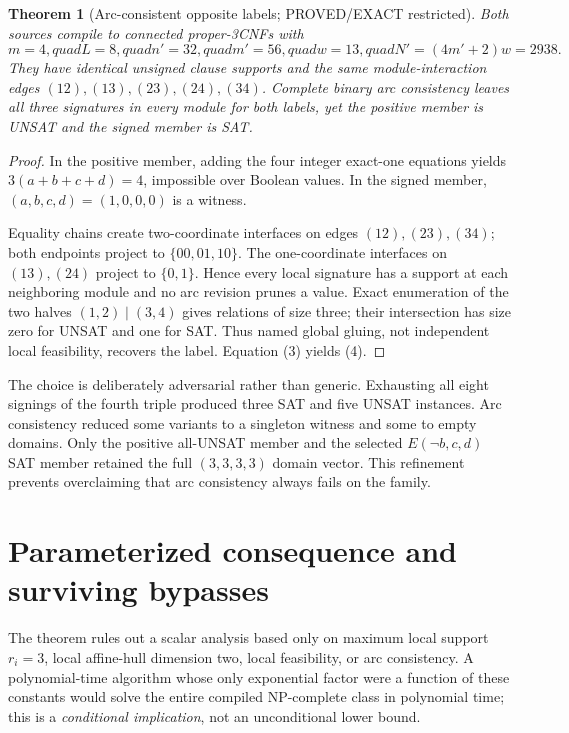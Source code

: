 \documentclass[11pt]{article}
\newtheorem{theorem}{Theorem}
\begin{document}
\begin{theorem}[Arc-consistent opposite labels; PROVED/EXACT restricted]
Both sources compile to connected proper-3CNFs with
\[
 m=4,quad L=8,quad n'=32,quad m'=56,quad
 w=13,quad N'=(4m'+2)w=2938.                                      \tag{4}
\]
They have identical unsigned clause supports and the same module-interaction
edges $(12),(13),(23),(24),(34)$.  Complete binary arc consistency leaves all
three signatures in every module for both labels, yet the positive member is
UNSAT and the signed member is SAT.
\end{theorem}
\begin{proof}
In the positive member, adding the four integer exact-one equations yields
$3(a+b+c+d)=4$, impossible over Boolean values.  In the signed member,
$(a,b,c,d)=(1,0,0,0)$ is a witness.

Equality chains create two-coordinate interfaces on edges $(12),(23),(34)$;
both endpoints project to $\{00,01,10\}$.  The one-coordinate interfaces on
$(13),(24)$ project to $\{0,1\}$.  Hence every local signature has a support
at each neighboring module and no arc revision prunes a value.  Exact
enumeration of the two halves $(1,2)\mid(3,4)$ gives relations of size three;
their intersection has size zero for UNSAT and one for SAT.  Thus named
global gluing, not independent local feasibility, recovers the label.
Equation (3) yields (4).
\end{proof}

The choice is deliberately adversarial rather than generic.  Exhausting all
eight signings of the fourth triple produced three SAT and five UNSAT
instances.  Arc consistency reduced some variants to a singleton witness and
some to empty domains.  Only the positive all-UNSAT member and the selected
$E(\neg b,c,d)$ SAT member retained the full $(3,3,3,3)$ domain vector.  This
refinement prevents overclaiming that arc consistency always fails on the
family.

\section{Parameterized consequence and surviving bypasses}
The theorem rules out a scalar analysis based only on maximum local support
$r_i=3$, local affine-hull dimension two, local feasibility, or arc
consistency.  A polynomial-time algorithm whose only exponential factor were
a function of these constants would solve the entire compiled NP-complete
class in polynomial time; this is a \emph{conditional implication}, not an
unconditional lower bound.
\end{document}
